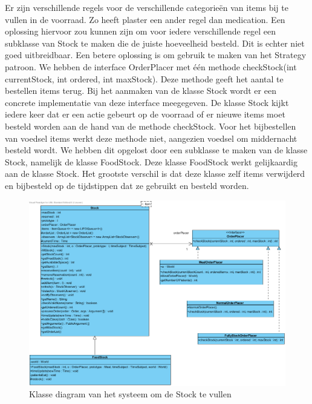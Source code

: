 \documentclass[a4paper]{article}
\begin{document}
Er zijn verschillende regels voor de verschillende categorie\"en van items bij te vullen in de voorraad. Zo heeft plaster een ander regel dan medication. Een oplossing hiervoor zou kunnen zijn om voor iedere verschillende regel een subklasse van Stock te maken die de juiste hoeveelheid besteld. Dit is echter niet goed uitbreidbaar. Een betere oplossing is om gebruik te maken van het Strategy patroon. We hebben de interface OrderPlacer met \'e\'en methode checkStock(int currentStock, int ordered, int maxStock). Deze methode geeft het aantal te bestellen items terug. Bij het aanmaken van de klasse Stock wordt er een concrete implementatie van deze interface meegegeven. De klasse Stock kijkt iedere keer dat er een actie gebeurt op de voorraad of er nieuwe items moet besteld worden aan de hand van de methode checkStock. Voor het bijbestellen van voedsel items werkt deze methode niet, aangezien voedsel om middernacht besteld wordt. We hebben dit opgelost door een subklasse te maken van de klasse Stock, namelijk de klasse FoodStock. Deze klasse FoodStock werkt gelijkaardig aan de klasse Stock. Het grootste verschil is dat deze klasse zelf items verwijderd en bijbesteld op de tijdstippen dat ze gebruikt en besteld worden.

\begin{figure}[h]
\centering
\includegraphics[width=\textwidth]{Pictures/StockOrder}
\caption{Klasse diagram van het systeem om de Stock te vullen}
\label{fig:StockOrder}
\end{figure}
\end{document}
